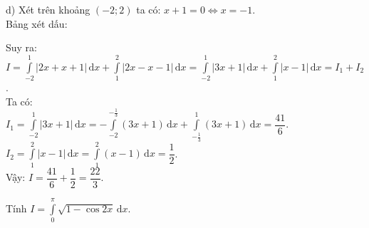 \begin{ex}
{		d) Xét trên khoảng $(-2;2)$ ta có: $x+1=0\Leftrightarrow x=-1$.\\
		Bảng xét dấu: 
		\begin{center}
		\end{center}
		Suy ra:\\
		$I=\displaystyle\int\limits_{-2}^1|2x+x+1|\mathrm{\,d}x+\displaystyle\int\limits_1^2|2x-x-1|\mathrm{\,d}x=\displaystyle\int\limits_{-2}^1|3x+1|\mathrm{\,d}x+\displaystyle\int\limits_1^2|x-1|\mathrm{\,d}x=I_1+I_2$.\\
		Ta có:\\
		$I_1=\displaystyle\int\limits_{-2}^1|3x+1|\mathrm{\,d}x=-\displaystyle\int\limits_{-2}^{-\tfrac{1}{3}}(3x+1)\mathrm{\,d}x+\displaystyle\int\limits_{-\tfrac{1}{3}}^1(3x+1)\mathrm{\,d}x=\dfrac{41}{6}$.\\
		$I_2=\displaystyle\int\limits_1^2|x-1|\mathrm{\,d}x=\displaystyle\int\limits_1^2(x-1)\mathrm{\,d}x=\dfrac{1}{2}$.\\
		Vậy: $I=\dfrac{41}{6}+\dfrac{1}{2}=\dfrac{22}{3}$.}
\end{ex}
\begin{ex}%
	Tính $I=\displaystyle\int\limits_0^{\pi}\sqrt{1-\cos 2x}\mathrm{\,d}x$.
\end{ex}
